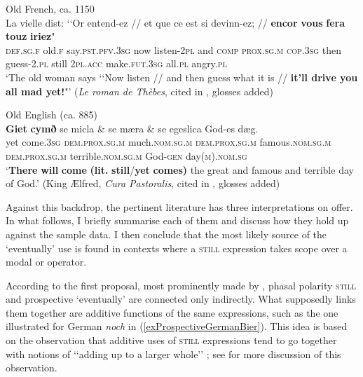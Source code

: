 \begin{exe}
	\ex Old French, ca. 1150\label{exProspectiveOldFrench}\\
	\gll La vielle dist: \lq\lq Or entend-ez // et que ce est si devinn-ez; // \textbf{encor} \textbf{vous} \textbf{fera} \textbf{touz} \textbf{iriez}"\\
	\textsc{def}.\textsc{sg}.\textsc{f} old.\textsc{f} say.\textsc{pst}.\textsc{pfv}.3\textsc{sg} \phantom{\lq\lq}now listen-2\textsc{pl} {} and \textsc{comp} \textsc{prox}.\textsc{sg}.\textsc{m} \textsc{cop}.3\textsc{sg} then guess-2.\textsc{pl} {} still 2\textsc{pl}.\textsc{acc} make.\textsc{fut}.3\textsc{sg} all.\textsc{pl} angry.\textsc{pl}\\
	\glt \lq The old woman says \lq\lq Now listen // and then guess what it is // \textbf{it’ll drive you all mad yet!}{"}\rq{} (\textit{Le roman de Thèbes}, cited in \cite[146]{MosegaardHansen2008},  glosses added)
	
	\ex Old English (ca. 885)\label{exProspectiveOldEnglish}\\
	\gll \textbf{Giet} \textbf{cymð} se micla \& se mæra \& se egeslica God-es dæg.\\
yet come.3\textsc{sg} \textsc{dem}.\textsc{prox}.\textsc{sg}.\textsc{m} much.\textsc{nom}.\textsc{sg}.\textsc{m} {} \textsc{dem}.\textsc{prox}.\textsc{sg}.\textsc{m} famous.\textsc{nom}.\textsc{sg}.\textsc{m}  {} \textsc{dem}.\textsc{prox}.\textsc{sg}.\textsc{m} terrible.\textsc{nom}.\textsc{sg}.\textsc{m} God-\textsc{gen} day(\textsc{m}).\textsc{nom}.\textsc{sg}\\
	\glt \lq \textbf{There} \textbf{will} \textbf{come} \textbf{(}\textbf{lit.} \textbf{still}/\textbf{yet} \textbf{comes}\textbf{)} the great and famous and terrible day of God.\rq{ }(King Ælfred, \textit{Cura Pastoralis}, cited in \cite[s.v. \textit{yet}]{OED2022},  glosses added)
\end{exe}

Against this backdrop, the pertinent literature has three interpretations on offer. In what follows, I briefly summarise each of them and discuss how they hold up against the sample data. I then conclude that the most likely source of the \lq eventually\rq{ }use is found in contexts where a \textsc{still} expression takes scope over a modal or  operator.

According to the first proposal, most prominently made by \textcite{KoenigTraugott1982}, phasal polarity \textsc{still} and prospective \lq eventually\rq{ }are connected only indirectly. What supposedly links them together are additive functions of the same expressions, such as the one illustrated for German \textit{noch} in (\ref{exProspectiveGermanBier}). This idea is based on the observation that additive uses of \textsc{still} expressions tend to  go together with notions of \lq\lq adding up to a larger whole\rq\rq{ }\parencite[146]{Koenig1991}; see  for more discussion of this observation.

